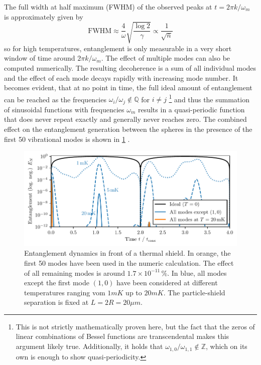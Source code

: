 The full width at half maximum (FWHM) of the observed peaks at $t=2\pi k/\omega_m$ is approximately given by
\begin{equation}
  \mathrm{FWHM} \approx \frac{4}{\omega}\sqrt{\frac{\log 2}{\gamma}} \propto \frac{1}{\sqrt{\bar{n}}}
\end{equation}
so for high temperatures, entanglement is only measurable in a very short window of time around $2\pi k / \omega_m$.
The effect of multiple modes can also be computed numerically. The resulting decoherence is a sum of all individual modes and the effect of each mode decays rapidly with increasing mode number.
It becomes evident, that at no point in time, the full ideal amount of entanglement can be reached as the frequencies $\omega_i / \omega_j \notin \mathbb{Q}$ for $i \neq j$ \footnote{This is not strictly mathematically proven here, but the fact that the zeros of linear combinations of Bessel functions are transcendental \cite{Lorch_1995} makes this argument likely true. Additionally, it holds that $\omega_{1,0}/\omega_{1,1}\notin\mathbb{Z}$, which on its own is enough to show quasi-periodicity.} and thus the summation of sinusoidal functions with frequencies $\omega_m$ results in a quasi-periodic function that does never repeat exactly and generally never reaches zero.
The combined effect on the entanglement generation between the spheres in the presence of the first 50 vibrational modes is shown in \cref{fig:5:entanglement-multiple-modes} .
\begin{figure}[!htbp]
  \centering
  \includegraphics[width=\textwidth]{./../figures/vibrations/entanglement-multiple-modes.pdf}
  \caption{Entanglement dynamics in front of a thermal shield. In orange, the first 50 modes have been used in the numeric calculation. The effect of all remaining modes is around $1.7 \times 10^{-11}\,\%$. In blue, all modes except the first mode $(1,0)$ have been considered at different temperatures ranging vom $1\si{mK}$ up to $20\si{mK}$. The particle-shield separation is fixed at $L = 2R = 20\si{\mu m}$.}
  \label{fig:5:entanglement-multiple-modes}
\end{figure}

